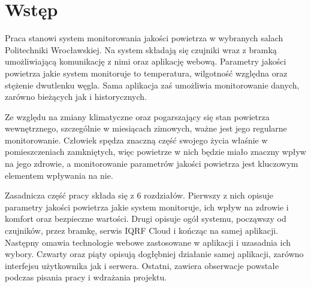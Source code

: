 \section{Wstęp}

Praca stanowi system monitorowania jakości powietrza w wybranych salach Politechniki Wrocławskiej. Na system składają się
czujniki wraz z bramką umożliwiającą komunikację z nimi oraz aplikację webową. Parametry jakości powietrza jakie system monitoruje 
to temperatura, wilgotność względna oraz stężenie dwutlenku węgla. Sama aplikacja zaś umożliwia monitorowanie danych, zarówno 
bieżących jak i historycznych.

Ze względu na zmiany klimatyczne oraz pogarszający się stan powietrza wewnętrznego, szczególnie w miesiącach zimowych, ważne jest jego 
regularne monitorowanie. Człowiek spędza znaczną część swojego życia właśnie w pomieszczeniach zamkniętych, więc powietrze w nich
będzie miało znaczny wpływ na jego zdrowie, a monitorowanie parametrów jakości powietrza jest kluczowym elementem wpływania na nie.

Zasadnicza część pracy składa się z 6 rozdziałów. Pierwszy z nich opisuje parametry jakości powietrza jakie system monitoruje, ich wpływ 
na zdrowie i komfort oraz bezpieczne wartości. Drugi opisuje ogół systemu, począwszy od czujników, przez bramkę, serwis IQRF Cloud i kończąc
na samej aplikacji. Następny omawia technologie webowe zastosowane w aplikacji i uzasadnia ich wybory. Czwarty oraz piąty opisują dogłębniej działanie
samej aplikacji, zarówno interfejsu użytkownika jak i serwera. Ostatni, zawiera obserwacje powstałe podczas pisania pracy i wdrażania projektu.






